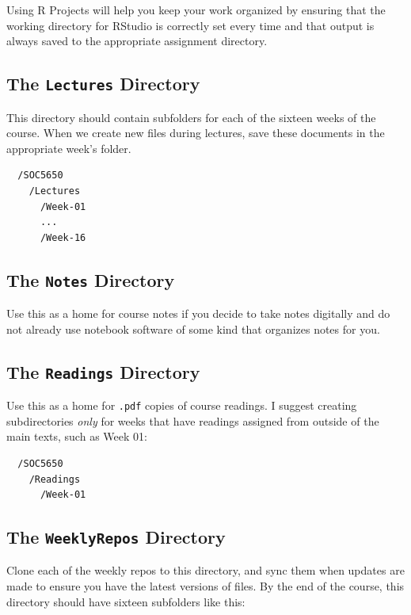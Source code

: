 \documentclass[]{book}
\theoremstyle{definition}
\theoremstyle{definition}
\theoremstyle{definition}
\theoremstyle{remark}
\begin{document}
Using R Projects will help you keep your work organized by ensuring that
the working directory for RStudio is correctly set every time and that
output is always saved to the appropriate assignment directory.

\subsection{\texorpdfstring{The \texttt{Lectures}
Directory}{The Lectures Directory}}\label{the-lectures-directory}

This directory should contain subfolders for each of the sixteen weeks
of the course. When we create new files during lectures, save these
documents in the appropriate week's folder.

\begin{verbatim}
  /SOC5650
    /Lectures
      /Week-01
      ...
      /Week-16
\end{verbatim}

\subsection{\texorpdfstring{The \texttt{Notes}
Directory}{The Notes Directory}}\label{the-notes-directory}

Use this as a home for course notes if you decide to take notes
digitally and do not already use notebook software of some kind that
organizes notes for you.

\subsection{\texorpdfstring{The \texttt{Readings}
Directory}{The Readings Directory}}\label{the-readings-directory}

Use this as a home for \texttt{.pdf} copies of course readings. I
suggest creating subdirectories \emph{only} for weeks that have readings
assigned from outside of the main texts, such as Week 01:

\begin{verbatim}
  /SOC5650
    /Readings
      /Week-01
\end{verbatim}

\subsection{\texorpdfstring{The \texttt{WeeklyRepos}
Directory}{The WeeklyRepos Directory}}\label{the-weeklyrepos-directory}

Clone each of the weekly repos to this directory, and sync them when
updates are made to ensure you have the latest versions of files. By the
end of the course, this directory should have sixteen subfolders like
this:
\end{document}
